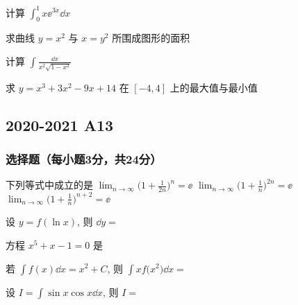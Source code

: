 \begin{ti}[6 分]
	计算 $\int_{0}^{1} x \ee^{3x} \dd{x}$
\end{ti}

\begin{ti}[6 分]
	求曲线 $y = x^{2}$ 与 $x = y^{2}$ 所围成图形的面积
\end{ti}

\begin{ti}[5 分]
	计算 $\int \frac{\dd{x}}{x^{2} \sqrt{1 - x^{2}}}$
\end{ti}

\begin{ti}[6 分]
	求 $y = x^{3} + 3x^{2} - 9x + 14$ 在 $[-4,4]$ 上的最大值与最小值
\end{ti}

\subsection{2020-2021 A13}
\subsubsection{选择题（每小题3分，共24分）}
\begin{ti}
	下列等式中成立的是 \kuo
	{$\lim_{n\to\infty} \bigl( 1 + \frac{1}{2n} \bigr)^n = \ee$}
	{$\lim_{n\to\infty} \bigl( 1 + \frac{1}{n} \bigr)^{2n} = \ee$}
	{$\lim_{n\to\infty} \bigl( 1 + \frac{1}{n} \bigr)^{n+2} = \ee$}
\end{ti}

\begin{ti}
	设 $y = f(\ln x)$, 则 $\dd{y} = $ \kuo
\end{ti}

\begin{ti}
	方程 $x^5 + x - 1 = 0$ 是 \kuo
\end{ti}

\begin{ti}
	若 $\int f(x) \dd{x} = x^2 + C$, 则 $\int x f\bigl(x^2\bigr) \dd{x} = $ \kuo
\end{ti}

\begin{ti}
	设 $I = \int \sin x \cos x \dd{x}$, 则 $I = $ \kuo
\end{ti}

